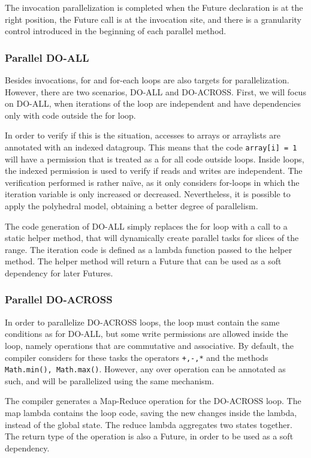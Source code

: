 \documentclass[smallextended]{svjour3}
\begin{document}
The invocation parallelization is completed when the Future declaration is at the right position, the Future call is at the invocation site, and there is a granularity control introduced in the beginning of each parallel method.

\subsubsection{Parallel DO-ALL}

Besides invocations, for and for-each loops are also targets for parallelization. However, there are two scenarios, DO-ALL and DO-ACROSS. First, we will focus on DO-ALL, when iterations of the loop are independent and have dependencies only with code outside the for loop.

In order to verify if this is the situation, accesses to arrays or arraylists are annotated with an indexed datagroup. This means that the code \lstinline|array[i] = 1| will have a permission  that is treated as a  for all code outside loops. Inside loops, the indexed permission is used to verify if reads and writes are independent. The verification performed is rather naïve, as it only considers for-loops in which the iteration variable is only increased or decreased. Nevertheless, it is possible to apply the polyhedral model, obtaining a better degree of parallelism.

The code generation of DO-ALL simply replaces the for loop with a call to a static helper method, that will dynamically create parallel tasks for slices of the range. The iteration code is defined as a lambda function passed to the helper method. The helper method will return a Future that can be used as a soft dependency for later Futures.

\subsubsection{Parallel DO-ACROSS}

In order to parallelize DO-ACROSS loops, the loop must contain the same conditions as for DO-ALL, but some write permissions are allowed inside the loop, namely operations that are commutative and associative. By default, the compiler considers for these tasks the operators \lstinline|+,-,*| and the methods \lstinline|Math.min(), Math.max()|. However, any over operation can be annotated as such, and will be parallelized using the same mechanism.

The compiler generates a Map-Reduce operation for the DO-ACROSS loop. The map lambda contains the loop code, saving the new changes inside the lambda, instead of the global state. The reduce lambda aggregates two states together. The return type of the operation is also a Future, in order to be used as a soft dependency.
\end{document}
